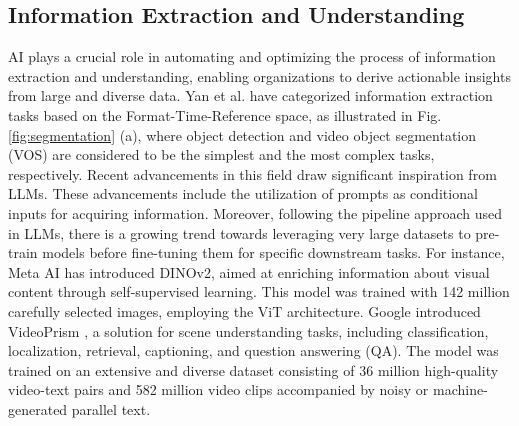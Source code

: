 \documentclass[11pt,a4paper]{article}
\begin{document}



\subsection{Information Extraction and Understanding}
\label{ssec:infoextract}

AI plays a crucial role in automating and optimizing the process of information extraction and understanding, enabling organizations to derive actionable insights from large and diverse data. Yan et al. \cite{Yan:Universal:2023} have categorized information extraction tasks based on the Format-Time-Reference space, as illustrated in Fig. \ref{fig:segmentation} (a), where object detection and video object segmentation (VOS) are considered to be the simplest and the most complex tasks, respectively. Recent advancements in this field draw significant inspiration from LLMs. These advancements include the utilization of prompts as conditional inputs for acquiring information. Moreover, following the pipeline approach used in LLMs, there is a growing trend towards leveraging very large datasets to pre-train models before fine-tuning them for specific downstream tasks. For instance, Meta AI \cite{Oquab:DINOv2:2024} has introduced DINOv2, aimed at enriching information about visual content through self-supervised learning. This model was trained with 142 million carefully selected images, employing the ViT architecture. Google introduced VideoPrism \cite{zhao:videoprism:2024}, a  solution for scene understanding tasks, including classification, localization, retrieval, captioning, and question answering (QA). The model was trained on an extensive and diverse dataset consisting of 36 million high-quality video-text pairs and 582 million video clips accompanied by noisy or machine-generated parallel text.

\end{document}
